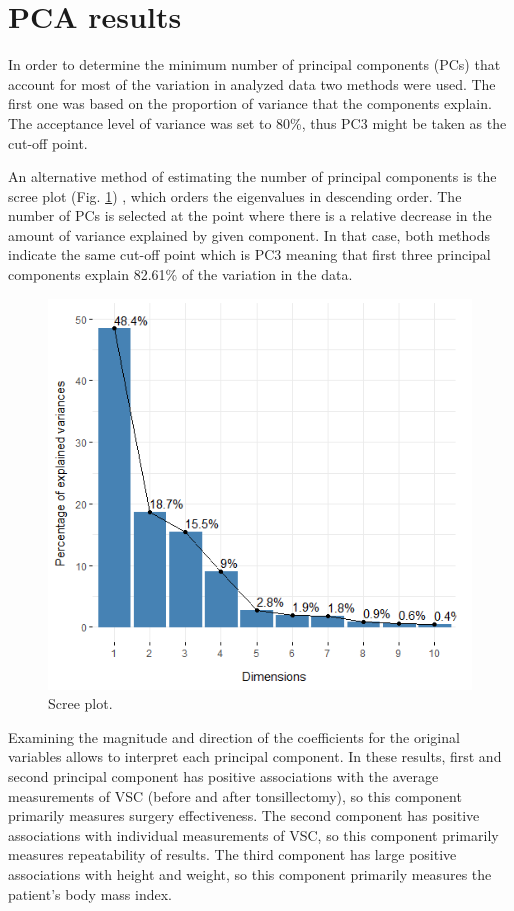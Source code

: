 \documentclass[12pt,a4paper,notitlepage]{report}
\begin{document}
\newpage
\section{PCA results}

In order to determine the minimum number of principal components (PCs) that account for most of the variation in analyzed data two methods were used. The first one was based on the proportion of variance that the components explain. The acceptance level of variance was set to 80\%, thus PC3 might be taken as the cut-off point.

An alternative method of estimating the number of principal components is the scree plot (Fig. \ref{fig:Fig_3.2}) , which orders the eigenvalues in descending order. The number of PCs is selected at the point where there is a relative decrease in the amount of variance explained by given component. In that case, both methods indicate the same cut-off point which is PC3 meaning that first three principal components explain 82.61\% of the variation in the data.

\begin{figure}[H]
	\centering
	\includegraphics[scale=0.75]{./Figures/Fig_3.2}
	\caption{Scree plot.}
	\label{fig:Fig_3.2}
\end{figure}	

Examining the magnitude and direction of the coefficients for the original variables allows to interpret each principal component. In these results, first and second principal component has positive associations with the average measurements of VSC (before and after tonsillectomy), so this component primarily measures surgery effectiveness. The second component has positive associations with individual measurements of VSC, so this component primarily measures repeatability of results. The third component has large positive associations with height and weight, so this component primarily measures the patient's body mass index. 
\end{document}
